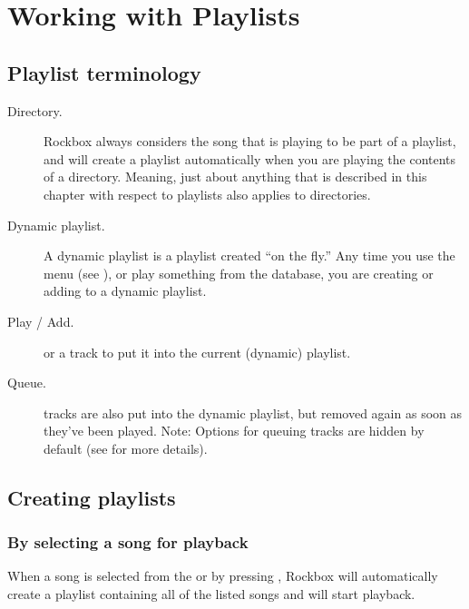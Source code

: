 \section{\label{ref:working_with_playlists}Working with Playlists}

\subsection{Playlist terminology}

\begin{description}
\item[Directory.] Rockbox always considers the song that is playing to be part of
  a playlist, and will create a playlist automatically when you are playing the
  contents of a directory. Meaning, just about anything that is described in this
  chapter with respect to playlists also applies to directories.

\item[Dynamic playlist.]  A dynamic playlist is a playlist created
  ``on the fly.'' Any time you use the  menu
  (see ), or play something
  from the database, you are creating or adding to a dynamic playlist.

\item[Play / Add.]  or  a track to
  put it into the current (dynamic) playlist.

\item[Queue.]  tracks are also put into the dynamic playlist,
  but removed again as soon as they've been played.
  Note: Options for queuing tracks are hidden by default (see  for more details).
\end{description}

\subsection{Creating playlists}

\subsubsection{By selecting a song for playback}
When a song is selected from the  or  by pressing
\ActionTreeEnter, Rockbox will automatically create a playlist containing all of the
listed songs and will start playback.


